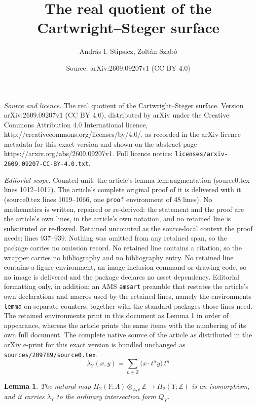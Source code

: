 \documentclass[10pt,a4paper]{amsart}
\title{The real quotient of the Cartwright--Steger surface}
\author{Andr\'as I. Stipsicz, Zolt\'an Szab\'o}
\date{Source: arXiv:2609.09207v1 (CC BY 4.0)}
\newtheorem{lemma}{Lemma}
\newcommand{\Z}{\mathbb Z}
\begin{document}
\maketitle

\noindent\emph{Source and licence.} The real quotient of the Cartwright--Steger surface. Version arXiv:2609.09207v1 (CC BY 4.0), distributed by arXiv under the Creative Commons Attribution 4.0 International licence, http://creativecommons.org/licenses/by/4.0/, as recorded in the arXiv licence metadata for this exact version and shown on the abstract page https://arxiv.org/abs/2609.09207v1. Full licence notice: \texttt{licenses/arxiv-2609.09207-CC-BY-4.0.txt}.\par\smallskip

\noindent\textit{Editorial scope.} Counted unit: the article's lemma lem:augmentation (source0.tex lines 1012--1017). The article's complete original proof of it is delivered with it (source0.tex lines 1019--1066, one \texttt{proof} environment of 48 lines). No mathematics is written, repaired or re-derived: the statement and the proof are the article's own lines, in the article's own notation, and no retained line is substituted or re-flowed.  Retained uncounted as the source-local context the proof needs: lines 937--939.  Nothing was omitted from any retained span, so the package carries no omission record.  No retained line contains a citation, so the wrapper carries no bibliography and no bibliography entry.  No retained line contains a figure environment, an image-inclusion command or drawing code, so no image is delivered and the package declares no asset dependency.  Editorial formatting only, in addition: an AMS \texttt{amsart} preamble that restates the article's own declarations and macros used by the retained lines, namely the environments \texttt{lemma} on separate counters, together with the standard packages those lines need.  The retained environments print in this document as Lemma 1 in order of appearance, whereas the article prints the same items with the numbering of its own full document.  The complete native source of the article as distributed in the arXiv e-print for this exact version is bundled unchanged as \texttt{sources/209789/source0.tex}.
\begin{equation}\label{eq:lambda-def}
 \lambda_Y(x,y)=\sum_{n\in\Z}\bigl(x\cdot t^ny\bigr)\,t^n
\end{equation}

\begin{lemma}\label{lem:augmentation}
  The natural map
  $H_2(Y;\Lambda)\otimes_{\Lambda,\varepsilon}\Z\to H_2(Y;\Z)$ is an
  isomorphism, and it carries $\lambda_Y$ to the ordinary intersection
  form $Q_Y$.
\end{lemma}
\end{document}

